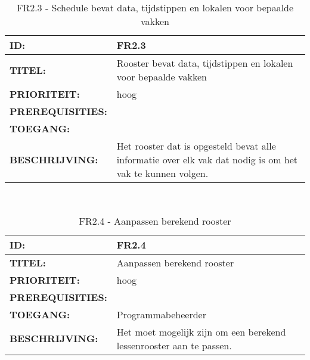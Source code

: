 \noindent\begin{table}[H]
	\begin{tabular}{l | p{10cm}}
	\textbf{ID:} & FR2.3 \\ \hline
	\textbf{TITEL:} & Rooster bevat data, tijdstippen en lokalen voor bepaalde vakken\\ \hline
	\textbf{PRIORITEIT:} &  hoog \\ \hline
	\textbf{PREREQUISITIES:} & \\ \hline
	\textbf{TOEGANG:} &  \\ \hline
	\textbf{BESCHRIJVING:} & Het rooster dat is opgesteld bevat alle informatie over elk vak dat nodig is om het vak te kunnen volgen.\\
	\end{tabular}\\
	\caption{FR2.3 - Schedule bevat data, tijdstippen en lokalen voor bepaalde vakken}
	\label{tab:FR2.3 - Schedule bevat data, tijdstippen en lokalen voor bepaalde vakken}
\end{table}
       
\noindent\begin{table}[H]
            \begin{tabular}{l | p{10cm}}
                \textbf{ID:} & FR2.4 \\ \hline
                \textbf{TITEL:} & Aanpassen berekend rooster \\ \hline
                \textbf{PRIORITEIT:} &  hoog \\ \hline
                \textbf{PREREQUISITIES:} & \\ \hline
                \textbf{TOEGANG:} & Programmabeheerder \\ \hline
                \textbf{BESCHRIJVING:} & Het moet mogelijk zijn om een berekend lessenrooster aan te passen.\\
            \end{tabular}\\
            \caption{FR2.4 - Aanpassen berekend rooster}
            \label{tab:FR2.4 - Aanpassen berekend rooster}
        \end{table}
        
